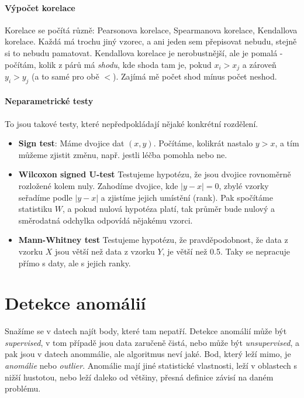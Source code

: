 \paragraph{Výpočet korelace} Korelace se počítá různě: Pearsonova korelace, Spearmanova korelace, Kendallova korelace. Každá má trochu jiný vzorec, a ani jeden sem přepisovat nebudu, stejně si to nebudu pamatovat. Kendallova korelace je nerobustnější, ale je pomalá - počítám, kolik z párů má \textit{shodu}, kde shoda tam je, pokud $x_i > x_j$ a zároveň $y_i > y_j$ (a to samé pro obě $<$). Zajímá mě počet shod mínus počet neshod.

\paragraph{Neparametrické testy} To jsou takové testy, které nepředpokládají nějaké konkrétní rozdělení.

\begin{itemize}
\item \textbf{Sign test}: Máme dvojice dat $(x, y)$. Počítáme, kolikrát nastalo $y > x$, a tím můžeme zjistit změnu, např. jestli léčba pomohla nebo ne.
\item \textbf{Wilcoxon signed U-test} Testujeme hypotézu, že jsou dvojice rovnoměrně rozložené kolem nuly. Zahodíme dvojice, kde $|y-x|=0$, zbylé vzorky seřadíme podle $|y-x|$ a zjistíme jejich umístění (rank). Pak spočítáme statistiku $W$, a pokud nulová hypotéza platí, tak průměr bude nulový a směrodatná odchylka odpovídá nějakému vzorci.
\item \textbf{Mann-Whitney test} Testujeme hypotézu, že pravděpodobnost, že data z vzorku $X$ jsou větší než data z vzorku $Y$, je větší než 0.5. Taky se nepracuje přímo s daty, ale s jejich ranky. 
\end{itemize}

\section{Detekce anomálií}

Snažíme se v datech najít body, které tam nepatří. Detekce anomálií může být \textit{supervised}, v tom případě jsou data zaručeně čistá, nebo může být \textit{unsupervised}, a pak jsou v datech anommálie, ale algoritmus neví jaké. Bod, který leží mimo, je \textit{anomálie} nebo \textit{outlier}. Anomálie mají jiné statistické vlastnosti, leží v oblastech s nižší hustotou, nebo leží daleko od většiny, přesná definice závisí na daném problému.

